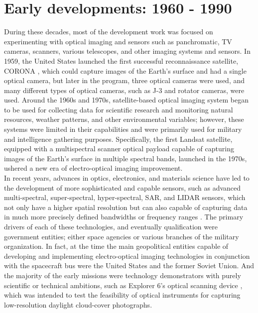 \documentclass[final,5p,times,twocolumn]{elsarticle}
\begin{document}
\section{Early developments: 1960 - 1990}
During these decades, most of the development work was focused on experimenting with optical imaging and sensors such as panchromatic, TV cameras, scanners, various telescopes, and other imaging systems and sensors. In 1959, the United States launched the first successful reconnaissance satellite, CORONA \citep{ruffner1995corona}, which could capture images of the Earth's surface and had a single optical camera, but later in the program, three optical cameras were used, and many different types of optical cameras, such as J-3 and rotator cameras, were used. 
Around the 1960s and 1970s, satellite-based optical imaging system began to be used for collecting data for scientific research and monitoring natural resources, weather patterns, and other environmental variables; however, these systems were limited in their capabilities and were primarily used for military and intelligence gathering purposes. Specifically, the first Landsat satellite, equipped with a multispectral scanner optical payload capable of capturing images of the Earth's surface in multiple spectral bands, launched in the 1970s, ushered a new era of electro-optical imaging improvement.\\
In recent years, advances in optics, electronics, and materials science have led to the development of more sophisticated and capable sensors, such as advanced multi-spectral, super-spectral, hyper-spectral, SAR, and LIDAR sensors, which not only have a higher spatial resolution but can also capable of capturing data in much more precisely defined bandwidths or frequency ranges \citep{madry2013electro}. The primary drivers of each of these technologies, and eventually qualification were government entities; either space agencies or various branches of the military organization. In fact, at the time the main geopolitical entities capable of developing and implementing electro-optical imaging technologies in conjunction with the spacecraft bus were the United States and the former Soviet Union. And the majority of the early missions were technology demonstrators with purely scientific or technical ambitions, such as Explorer 6's optical scanning device \citep{judge1962observations}, which was intended to test the feasibility of optical instruments for capturing low-resolution daylight cloud-cover photographs. \\
\end{document}
